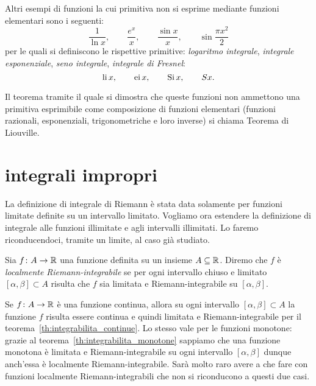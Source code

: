 Altri esempi di funzioni la cui primitiva non si esprime mediante 
funzioni elementari sono i seguenti:
\[
  \frac{1}{\ln x}, \qquad 
  \frac{e^x}{x}, \qquad
  \frac{\sin x}{x}, \qquad \sin\frac{\pi x^2}{2}
\]
per le quali si definiscono le rispettive primitive:
\emph{logaritmo integrale}, \emph{integrale esponenziale},
\emph{seno integrale},
\emph{integrale di Fresnel}:
\[
\operatorname{li} x, \qquad 
\operatorname{ei} x, \qquad 
\operatorname{Si} x, \qquad
S x.
\]

Il teorema tramite il quale si dimostra che queste 
funzioni non ammettono una primitiva esprimibile come 
composizione di funzioni elementari (funzioni razionali, 
esponenziali, trigonometriche e loro inverse) si chiama 
Teorema di Liouville.%
\newsavebox{\qrDeLellis}%

\section{integrali impropri}

La definizione di integrale di Riemann è stata data solamente per funzioni
limitate definite su un intervallo
limitato.
Vogliamo ora estendere la definizione di integrale alle funzioni illimitate e
agli intervalli illimitati.
Lo faremo riconducendoci, tramite un limite, al caso già studiato.

\begin{definition}
\label{def:localmente_riemann}
Sia $f\colon A \to {\mathbb R}$ una funzione definita su un insieme $A\subseteq {\mathbb R}$.
Diremo che $f$ è \emph{localmente Riemann-integrabile} se
per ogni intervallo chiuso e limitato $[\alpha,\beta]\subset A$ risulta
che $f$ sia limitata e Riemann-integrabile su $[\alpha,\beta]$.
\end{definition}

\begin{remark}
Se $f\colon A \to {\mathbb R}$ è una funzione continua, allora su ogni
intervallo $[\alpha,\beta]\subset A$ la funzione $f$ risulta essere continua
e quindi limitata e Riemann-integrabile per il teorema~\ref{th:integrabilita_continue}.
Lo stesso vale per le funzioni monotone:
grazie al teorema~\ref{th:integrabilita_monotone}
sappiamo che una funzione monotona è limitata e
Riemann-integrabile su ogni intervallo $[\alpha,\beta]$ dunque anch'essa
è localmente Riemann-integrabile. Sarà molto raro avere a che fare con
funzioni localmente Riemann-integrabili che non si riconducono
a questi due casi.
\end{remark}

